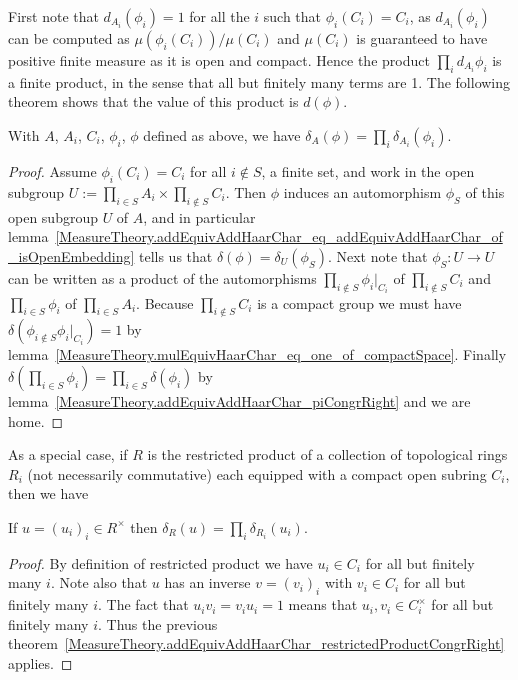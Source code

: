 First note that $d_{A_i}(\phi_i)=1$ for all the $i$ such that $\phi_i(C_i)=C_i$, as
$d_{A_i}(\phi_i)$ can be computed as $\mu(\phi_i(C_i))/\mu(C_i)$ and $\mu(C_i)$ is
guaranteed to have positive finite measure as it is open and compact. Hence the product
$\prod_id_{A_i}\phi_i$ is a finite product, in the sense that all but finitely many terms are 1.
The following theorem shows that the value of this product is $d(\phi)$.

\begin{theorem}
  \label{MeasureTheory.addEquivAddHaarChar_restrictedProductCongrRight}
  \leanok
  With $A$, $A_i$, $C_i$, $\phi_i$, $\phi$ defined as above, we have
  $\delta_A(\phi)=\prod_i\delta_{A_i}(\phi_i)$.
\end{theorem}
\begin{proof}
  Assume $\phi_i(C_i)=C_i$ for all $i\not\in S$, a finite set, and work in the
  open subgroup $U:=\prod_{i\in S}A_i\times\prod_{i\not\in S}C_i$. Then $\phi$ induces
  an automorphism $\phi_S$ of this open subgroup $U$ of $A$, and in particular
  lemma~\ref{MeasureTheory.addEquivAddHaarChar_eq_addEquivAddHaarChar_of_isOpenEmbedding} tells us
  that $\delta(\phi)=\delta_U(\phi_S)$.
  Next note that $\phi_S:U\to U$ can be written as a product of the automorphisms
  $\prod_{i\not\in S}\phi_i|_{C_i}$ of $\prod_{i\not\in S}C_i$ and
  $\prod_{i\in S}\phi_i$ of $\prod_{i\in S}A_i$. Because $\prod_{i\not\in S}C_i$ is a compact
  group we must have $\delta(\phi_{i\not\in S}\phi_i|_{C_i})=1$
  by lemma~\ref{MeasureTheory.mulEquivHaarChar_eq_one_of_compactSpace}. Finally
  $\delta(\prod_{i\in S}\phi_i)=\prod_{i\in S}\delta(\phi_i)$ by
  lemma~\ref{MeasureTheory.addEquivAddHaarChar_piCongrRight} and we are home.
\end{proof}

As a special case, if $R$ is the restricted product of a collection of topological rings $R_i$
  (not necessarily commutative) each equipped with a compact open subring $C_i$, then
  we have

\begin{corollary}
  \label{MeasureTheory.ringHaarChar_restrictedProduct}
  \leanok
  If $u=(u_i)_i\in R^\times$ then $\delta_R(u)=\prod_i\delta_{R_i}(u_i)$.
\end{corollary}
\begin{proof}
  \leanok
  By definition of restricted product we have $u_i\in C_i$ for all but finitely many $i$.
  Note also that $u$ has an inverse $v=(v_i)_i$ with $v_i\in C_i$ for all but finitely many $i$.
  The fact that $u_iv_i=v_iu_i=1$ means that $u_i,v_i\in C_i^\times$ for all but finitely many $i$.
  Thus the previous theorem~\ref{MeasureTheory.addEquivAddHaarChar_restrictedProductCongrRight} applies.
\end{proof}

